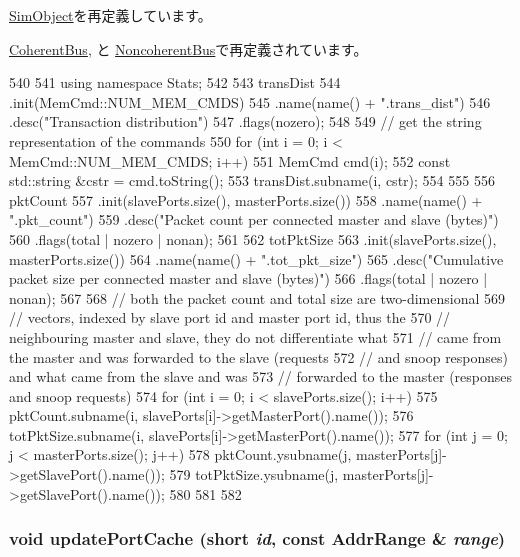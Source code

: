 \hyperlink{classSimObject_a4dc637449366fcdfc4e764cdf12d9b11}{SimObject}を再定義しています。

\hyperlink{classCoherentBus_a4dc637449366fcdfc4e764cdf12d9b11}{CoherentBus}, と \hyperlink{classNoncoherentBus_a4dc637449366fcdfc4e764cdf12d9b11}{NoncoherentBus}で再定義されています。


\begin{DoxyCode}
540 {
541     using namespace Stats;
542 
543     transDist
544         .init(MemCmd::NUM_MEM_CMDS)
545         .name(name() + ".trans_dist")
546         .desc("Transaction distribution")
547         .flags(nozero);
548 
549     // get the string representation of the commands
550     for (int i = 0; i < MemCmd::NUM_MEM_CMDS; i++) {
551         MemCmd cmd(i);
552         const std::string &cstr = cmd.toString();
553         transDist.subname(i, cstr);
554     }
555 
556     pktCount
557         .init(slavePorts.size(), masterPorts.size())
558         .name(name() + ".pkt_count")
559         .desc("Packet count per connected master and slave (bytes)")
560         .flags(total | nozero | nonan);
561 
562     totPktSize
563         .init(slavePorts.size(), masterPorts.size())
564         .name(name() + ".tot_pkt_size")
565         .desc("Cumulative packet size per connected master and slave (bytes)")
566         .flags(total | nozero | nonan);
567 
568     // both the packet count and total size are two-dimensional
569     // vectors, indexed by slave port id and master port id, thus the
570     // neighbouring master and slave, they do not differentiate what
571     // came from the master and was forwarded to the slave (requests
572     // and snoop responses) and what came from the slave and was
573     // forwarded to the master (responses and snoop requests)
574     for (int i = 0; i < slavePorts.size(); i++) {
575         pktCount.subname(i, slavePorts[i]->getMasterPort().name());
576         totPktSize.subname(i, slavePorts[i]->getMasterPort().name());
577         for (int j = 0; j < masterPorts.size(); j++) {
578             pktCount.ysubname(j, masterPorts[j]->getSlavePort().name());
579             totPktSize.ysubname(j, masterPorts[j]->getSlavePort().name());
580         }
581     }
582 }
\end{DoxyCode}
\hypertarget{classBaseBus_a3b429b2b5fe74236299bcb556d2308e7}{
\subsubsection[{updatePortCache}]{\setlength{\rightskip}{0pt plus 5cm}void updatePortCache (short {\em id}, \/  const {\bf AddrRange} \& {\em range})}}
\label{classBaseBus_a3b429b2b5fe74236299bcb556d2308e7}




